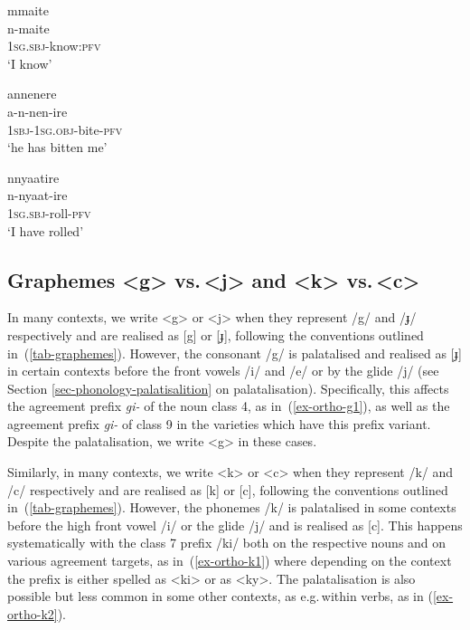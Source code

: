 \ea \label{ex-ortho-geminate}
\begin{xlist}	
    \ex \label{ex-ortho-geminate-a}
    \glll mmaite\\
    	    n-maite\\
	\textsc{1sg.sbj}-know:\textsc{pfv}\\
    \glt  ‘I know’

   \ex  \label{ex-ortho-geminate-b}
    \glll annenere\\
    	    a-n-nen-ire\\
	\textsc{1sbj}-\textsc{1sg.obj}-bite-\textsc{pfv}\\
    \glt  ‘he has bitten me'
    
    \ex  \label{ex-ortho-geminate-ny}
    \glll nnyaatire\\
        n-nyaat-ire\\
	\textsc{1sg.sbj}-roll-\textsc{pfv}\\
    \glt  ‘I have rolled'
    
\end{xlist}	
\z


\subsection{Graphemes <g> vs.\,<j> and <k> vs.\,<c>} \label{sec-orthogr-gjkc}
In many contexts, we write <g> or <j> when they represent /g/ and /ɟ/ respectively and are realised as [g] or [ɟ], following the conventions outlined in~(\ref{tab-graphemes}).  
However, the consonant /g/ is palatalised and realised as [ɟ] in certain contexts before the front vowels /i/ and /e/ or by the glide /j/ (see Section \ref{sec-phonology-palatisalition} on palatalisation). 
Specifically, this affects the agreement prefix  \textit{gi-} of the noun class 4, as in~(\ref{ex-ortho-g1}), as well as the agreement prefix  \textit{gi-} of class 9 in the varieties which have this prefix variant. 
Despite the palatalisation, we write <g> in these cases. 

Similarly, in many contexts, we write <k> or <c> when they represent /k/ and /c/ respectively and are realised as [k] or [c], following the conventions outlined in~(\ref{tab-graphemes}). 
However, the phonemes /k/ is palatalised in some contexts  before the high front vowel /i/ or the glide /j/ and is realised as [c]. 
This happens systematically with the class 7 prefix /ki/ both on the respective nouns and on various agreement targets, as in~(\ref{ex-ortho-k1}) where depending on the context the prefix is either spelled as <ki> or as <ky>.
The palatalisation is also possible but less common in some other contexts, as e.g.\,within verbs, as in (\ref{ex-ortho-k2}).

